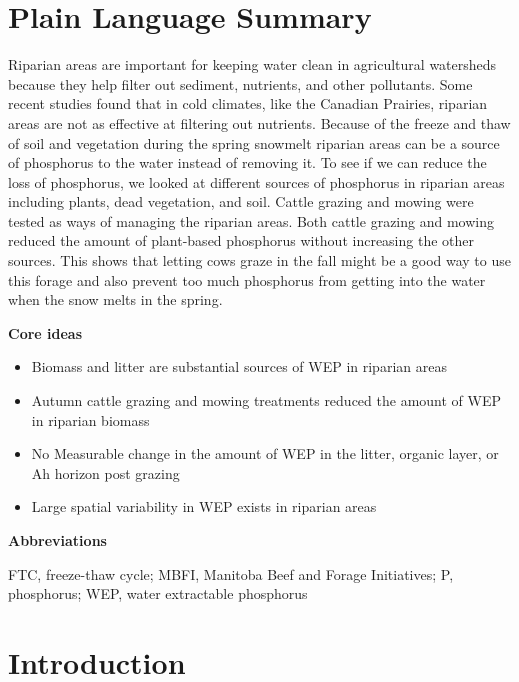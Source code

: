 \documentclass[
]{agujournal2019}
\providecommand{\tightlist}{%
  \setlength{\itemsep}{0pt}\setlength{\parskip}{0pt}}\usepackage{longtable,booktabs,array}
\begin{document}
\section*{Plain Language Summary}
Riparian areas are important for keeping water clean in agricultural
watersheds because they help filter out sediment, nutrients, and other
pollutants. Some recent studies found that in cold climates, like the
Canadian Prairies, riparian areas are not as effective at filtering out
nutrients. Because of the freeze and thaw of soil and vegetation during
the spring snowmelt riparian areas can be a source of phosphorus to the
water instead of removing it. To see if we can reduce the loss of
phosphorus, we looked at different sources of phosphorus in riparian
areas including plants, dead vegetation, and soil. Cattle grazing and
mowing were tested as ways of managing the riparian areas. Both cattle
grazing and mowing reduced the amount of plant-based phosphorus without
increasing the other sources. This shows that letting cows graze in the
fall might be a good way to use this forage and also prevent too much
phosphorus from getting into the water when the snow melts in the
spring.




\textbf{Core ideas}

\begin{itemize}
\tightlist
\item
  Biomass and litter are substantial sources of WEP in riparian areas
\item
  Autumn cattle grazing and mowing treatments reduced the amount of WEP
  in riparian biomass
\item
  No Measurable change in the amount of WEP in the litter, organic
  layer, or Ah horizon post grazing
\item
  Large spatial variability in WEP exists in riparian areas
\end{itemize}

\textbf{Abbreviations}

FTC, freeze-thaw cycle; MBFI, Manitoba Beef and Forage Initiatives; P,
phosphorus; WEP, water extractable phosphorus

\section{Introduction}\label{introduction}
\end{document}
